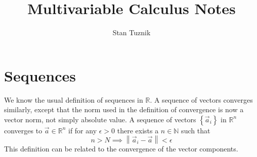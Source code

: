 
\title{Multivariable Calculus Notes}
\author{Stan Tuznik}




\maketitle
\tableofcontents



\chapter{Sequences}

We know the usual definition of sequences in $\mathbb{R}$. A sequence of vectors converges similarly, except that the norm used in the definition of convergence is now a vector norm, not simply absolute value. A sequence of vectors $\left\{ \vec{a}_i\right\}$ in $\mathbb{R}^n$ converges to $\vec{a}\in \mathbb{R}^n$ if for any $\epsilon >0 $ there exists a $n\in \mathbb{N}$ such that \[ n>N \implies \left\lVert \vec{a}_i - \vec{a}\right\rVert < \epsilon \] This definition can be related to the convergence of the vector components.

